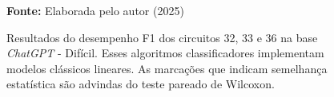 \begin{figure}
\caption{Resultados do desempenho F1 dos circuitos 32, 33 e 36 na base \textit{ChatGPT} - Difícil. Esses algoritmos classificadores implementam modelos clássicos lineares. As marcações que indicam semelhança estatística são advindas do teste pareado de Wilcoxon.}
\label{fig:f1:hard:g4}
     \centering
    \centering

      \par\medskip\ABNTEXfontereduzida\selectfont\textbf{Fonte:} Elaborada pelo autor (2025) \par\medskip
\end{figure}